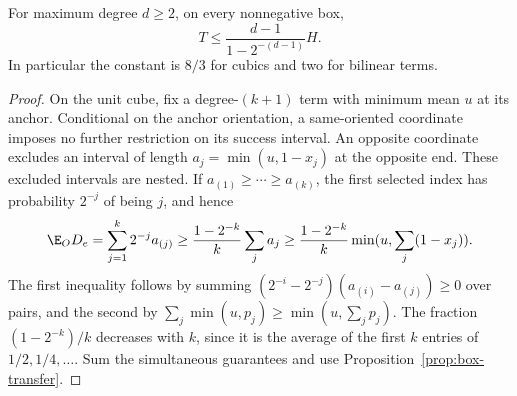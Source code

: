 \begin{proposition}\label{prop:endpoint-orientation}
For maximum degree $d\ge2$, on every nonnegative box,
\begin{equation}\label{eq:endpoint-bound}
 T\le\frac{d-1}{1-2^{-(d-1)}}H.
\end{equation}
In particular the constant is $8/3$ for cubics and two for bilinear terms.
\end{proposition}
\begin{proof}
On the unit cube, fix a degree-$(k+1)$ term with minimum mean $u$ at its
anchor. Conditional on the anchor orientation, a same-oriented coordinate
imposes no further restriction on its success interval. An opposite
coordinate excludes an interval of length $a_j=\min(u,1-x_j)$ at the
opposite end. These excluded intervals are nested. If
$a_{(1)}\ge\cdots\ge a_{(k)}$, the first selected index has probability
$2^{-j}$ of being $j$, and hence
\[
 \E_O D_e=\sum_{j=1}^k2^{-j}a_{(j)}
 \ge\frac{1-2^{-k}}{k}\sum_ja_j
 \ge\frac{1-2^{-k}}{k}\min(u,\sum_j(1-x_j)).
\]
The first inequality follows by summing
$(2^{-i}-2^{-j})(a_{(i)}-a_{(j)})\ge0$ over pairs, and the second by
$\sum_j\min(u,p_j)\ge\min(u,\sum_jp_j)$. The fraction
$(1-2^{-k})/k$ decreases with $k$, since it is the average of the first
$k$ entries of $1/2,1/4,\ldots$. Sum the simultaneous guarantees and use
Proposition~\ref{prop:box-transfer}.
\end{proof}

